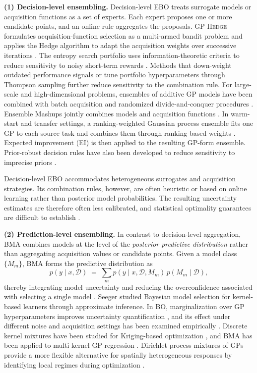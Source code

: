 \documentclass[lettersize,journal]{IEEEtran}
\begin{document}
\textbf{(1) Decision-level ensembling.}
Decision-level EBO treats surrogate models or acquisition functions as a set of experts. Each expert proposes one or more candidate points, and an online rule aggregates the proposals. \textsc{GP-Hedge} formulates acquisition-function selection as a multi-armed bandit problem and applies the Hedge algorithm to adapt the acquisition weights over successive iterations \cite{Hoffman2011GPHedge}. The entropy search portfolio uses information-theoretic criteria to reduce sensitivity to noisy short-term rewards \cite{Shahriari2014ESP}. Methods that down-weight outdated performance signals \cite{Vasconcelos2019NoPAStBO} or tune portfolio hyperparameters through Thompson sampling \cite{Vasconcelos2022SETUPBO} further reduce sensitivity to the combination rule. For large-scale and high-dimensional problems, ensembles of additive GP models have been combined with batch acquisition and randomized divide-and-conquer procedures \cite{Wang2018EBO}. Ensemble Mashups jointly combines models and acquisition functions \cite{Ravishankar2024EnsembleMashups}. In warm-start and transfer settings, a ranking-weighted Gaussian process ensemble fits one GP to each source task and combines them through ranking-based weights \cite{Feurer2018RGPE}. Expected improvement (EI) is then applied to the resulting GP-form ensemble. Prior-robust decision rules have also been developed to reduce sensitivity to imprecise priors \cite{Rodemann2024ImpreciseBO}.

Decision-level EBO accommodates heterogeneous surrogates and acquisition strategies. Its combination rules, however, are often heuristic or based on online learning rather than posterior model probabilities. The resulting uncertainty estimates are therefore often less calibrated, and statistical optimality guarantees are difficult to establish \cite{Hoeting1999BMA}.

\textbf{(2) Prediction-level ensembling.}
In contrast to decision-level aggregation, BMA combines models at the level of the \emph{posterior predictive distribution} rather than aggregating acquisition values or candidate points. Given a model class $\{M_m\}$, BMA forms the predictive distribution as
\begin{equation}
p(y \mid x, \mathcal{D}) \;=\; \sum_{m} p(y \mid x, \mathcal{D}, M_m)\, p(M_m \mid \mathcal{D}),
\end{equation}
thereby integrating model uncertainty and reducing the overconfidence associated with selecting a single model \cite{Hoeting1999BMA}. Seeger \cite{Seeger2000BayesianModelSelection} studied Bayesian model selection for kernel-based learners through approximate inference. In BO, marginalization over GP hyperparameters improves uncertainty quantification \cite{Snoek2012PracticalBO}, and its effect under different noise and acquisition settings has been examined empirically \cite{DeAth2021HowBayesian}. Discrete kernel mixtures have been studied for Kriging-based optimization \cite{Ginsbourger2008DiscreteKernelMixtures}, and BMA has been applied to multi-kernel GP regression \cite{Yu2013BMAMKGPR}. Dirichlet process mixtures of GPs provide a more flexible alternative for spatially heterogeneous responses by identifying local regimes during optimization \cite{Zhang2026RAMBO}.
\end{document}
